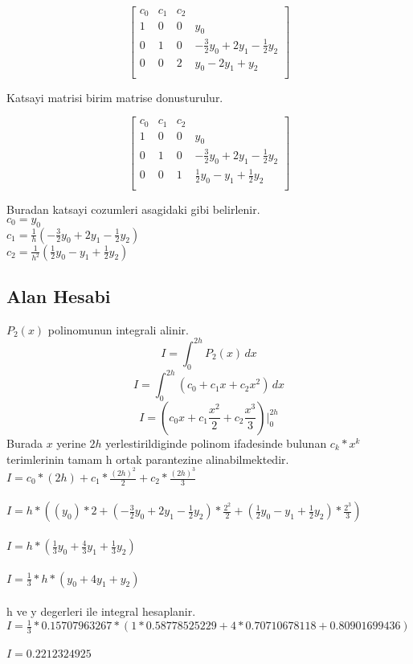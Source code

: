 \documentclass{article}
\begin{document}
\begin{center}
$$ \left[\begin{array}{rrr|r}
c_{0} & c_{1} & c_{2}\\
1 & 0 & 0 & y_{0}\\
0 & 1 & 0 & -\frac{3}{2}y_{0}+2y_{1}-\frac{1}{2}y_{2}\\
0 & 0 & 2 & y_{0}-2y_{1}+y_{2}\\
\end{array}\right] $$
\end{center}
Katsayi matrisi birim matrise donusturulur.
\begin{center}
$$ \left[\begin{array}{rrr|r}
c_{0} & c_{1} & c_{2}\\
1 & 0 & 0 & y_{0}\\
0 & 1 & 0 & -\frac{3}{2}y_{0}+2y_{1}-\frac{1}{2}y_{2}\\
0 & 0 & 1 & \frac{1}{2}y_{0}-y_{1}+\frac{1}{2}y_{2}\\
\end{array}\right] $$
\end{center}
Buradan katsayi cozumleri asagidaki gibi belirlenir.\\
$\displaystyle c_{0}=y_{0}$\\
$\displaystyle c_{1}=\frac{1}{h}(-\frac{3}{2}y_{0}+2y_{1}-\frac{1}{2}y_{2})$\\
$\displaystyle c_{2}=\frac{1}{h^{2}}(\frac{1}{2}y_{0}-y_{1}+\frac{1}{2}y_{2})$\\
\subsection{Alan Hesabi}
$P_{2}(x)$ polinomunun integrali alinir.\\
\[ I=\int_{0}^{2h} P_{2}(x) \,dx \]
\[ I=\int_{0}^{2h} (c_{0}+c_{1}x+c_{2}x^{2}) \,dx \]
\[ I=(c_{0}x+c_{1}\frac{x^{2}}{2}+c_{2}\frac{x^{3}}{3})\bigg\vert_{0}^{2h} \]
Burada $x$ yerine $2h$ yerlestirildiginde polinom ifadesinde bulunan $c_{k}*x^{k}$ terimlerinin tamam h ortak parantezine alinabilmektedir.\\
$\displaystyle I=c_{0}*(2h)+c_{1}*\frac{(2h)^{2}}{2}+c_{2}*\frac{(2h)^{3}}{3}$\\\\
$\displaystyle I=h*((y_{0})*2+(-\frac{3}{2}y_{0}+2y_{1}-\frac{1}{2}y_{2})*\frac{2^{2}}{2}+(\frac{1}{2}y_{0}-y_{1}+\frac{1}{2}y_{2})*\frac{2^{3}}{3})$\\\\
$\displaystyle I=h*(\frac{1}{3}y_{0}+\frac{4}{3}y_{1}+\frac{1}{3}y_{2})$\\\\
$\displaystyle I=\frac{1}{3}*h*(y_{0}+4y_{1}+y_{2})$\\\\
h ve y degerleri ile integral hesaplanir.\\
$\displaystyle I=\frac{1}{3}*0.15707963267*(1*0.58778525229+4*0.70710678118+0.80901699436)$\\\\
$\displaystyle I=0.2212324925$\\\\
\end{document}
